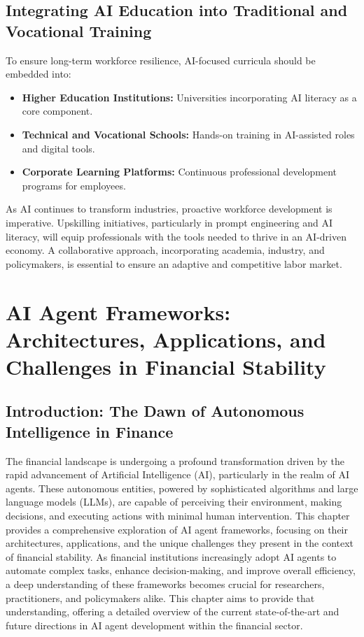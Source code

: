 \documentclass[a4paper,headinclude=on,footinclude=on,12pt,oneside]{scrbook}
\begin{document}
\section{Integrating AI Education into Traditional and Vocational Training}

To ensure long-term workforce resilience, AI-focused curricula should be embedded into:
\begin{itemize}
	\item \textbf{Higher Education Institutions:} Universities incorporating AI literacy as a core component.
	\item \textbf{Technical and Vocational Schools:} Hands-on training in AI-assisted roles and digital tools.
	\item \textbf{Corporate Learning Platforms:} Continuous professional development programs for employees.
\end{itemize}


As AI continues to transform industries, proactive workforce development is imperative. Upskilling initiatives, particularly in prompt engineering and AI literacy, will equip professionals with the tools needed to thrive in an AI-driven economy. A collaborative approach, incorporating academia, industry, and policymakers, is essential to ensure an adaptive and competitive labor market.
%

\chapter{AI Agent Frameworks: Architectures, Applications, and Challenges in Financial Stability}

\section{Introduction: The Dawn of Autonomous Intelligence in Finance}

The financial landscape is undergoing a profound transformation driven by the rapid advancement of Artificial Intelligence (AI), particularly in the realm of AI agents. These autonomous entities, powered by sophisticated algorithms and large language models (LLMs), are capable of perceiving their environment, making decisions, and executing actions with minimal human intervention. This chapter provides a comprehensive exploration of AI agent frameworks, focusing on their architectures, applications, and the unique challenges they present in the context of financial stability. As financial institutions increasingly adopt AI agents to automate complex tasks, enhance decision-making, and improve overall efficiency, a deep understanding of these frameworks becomes crucial for researchers, practitioners, and policymakers alike. This chapter aims to provide that understanding, offering a detailed overview of the current state-of-the-art and future directions in AI agent development within the financial sector.
\end{document}

